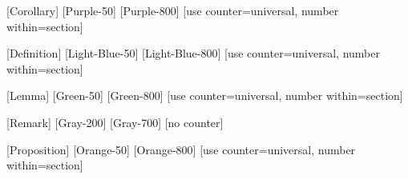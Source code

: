 
 [Corollary] [Purple-50] [Purple-800] 
[use counter=universal, number within=section]

\newenvironment{corollary}[1][] {\begin{Corollary}{#1}{}} {\end{Corollary}}

 [Definition] [Light-Blue-50] [Light-Blue-800]
[use counter=universal, number within=section]

\newenvironment{definition}[1][] {\begin{Definition}{#1}{}} {\end{Definition}}

\theoremstyle{definition}
\newtheorem*{Example}{\color{primary}Example}

\newenvironment{example}
{\begin{Example}}
{\hfill\ensuremath{\color{primary}\diamondsuit}\end{Example}}

 [Lemma] [Green-50] [Green-800]
[use counter=universal, number within=section]

\newenvironment{lemma}[1][] {\begin{Lemma}{#1}{}} {\end{Lemma}}

 [Remark] [Gray-200] [Gray-700] [no counter]

\newenvironment{remark}[1][] {\begin{Remark}{#1}{}} {\end{Remark}}

 [Proposition] [Orange-50] [Orange-800]
[use counter=universal, number within=section]

\newenvironment{proposition}[1][] {\begin{Proposition}{#1}{}} {\end{Proposition}}

